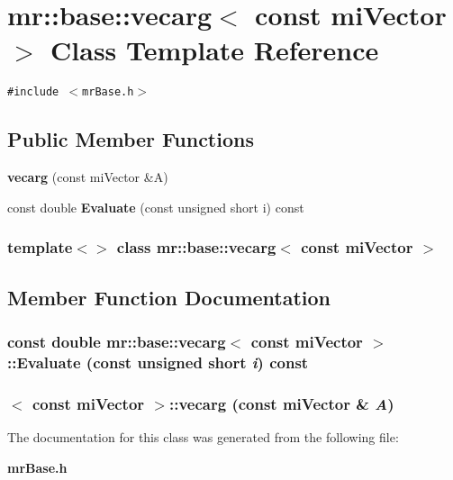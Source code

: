\section{mr::base::vecarg$<$ const mi\-Vector $>$ Class Template Reference}
\label{classmr_1_1base_1_1vecarg_3_01const_01miVector_01_4}
{\tt \#include $<$mr\-Base.h$>$}

\subsection*{Public Member Functions}
\begin{CompactItemize}
\item 
{\bf vecarg} (const mi\-Vector \&A)
\item 
const double {\bf Evaluate} (const unsigned short i) const 
\end{CompactItemize}
\subsubsection*{template$<$$>$ class mr::base::vecarg$<$ const mi\-Vector $>$}



\subsection{Member Function Documentation}
\subsubsection{\setlength{\rightskip}{0pt plus 5cm}const double {\bf mr::base::vecarg}$<$ const mi\-Vector $>$::Evaluate (const unsigned short {\em i}) const\hspace{0.3cm}{\tt  [inline]}}\label{classmr_1_1base_1_1vecarg_3_01const_01miVector_01_4_a1}


\subsubsection{$<$ const mi\-Vector $>$::{\bf vecarg} (const mi\-Vector \& {\em A})\hspace{0.3cm}{\tt  [inline]}}\label{classmr_1_1base_1_1vecarg_3_01const_01miVector_01_4_a0}




The documentation for this class was generated from the following file:\begin{CompactItemize}
\item 
{\bf mr\-Base.h}\end{CompactItemize}
